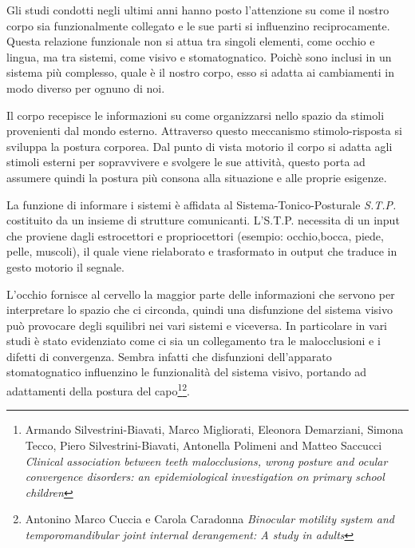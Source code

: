 



Gli studi condotti negli ultimi anni hanno posto l'attenzione su come il nostro corpo sia funzionalmente collegato e le sue parti si influenzino reciprocamente. Questa relazione funzionale non si attua tra singoli elementi, come occhio e lingua, ma tra sistemi, come visivo e stomatognatico. Poichè sono inclusi in un sistema più complesso, quale è il nostro corpo, esso si adatta ai cambiamenti in modo diverso per ognuno di noi.

Il corpo recepisce le informazioni su come organizzarsi nello spazio da stimoli provenienti dal mondo esterno. Attraverso questo meccanismo stimolo-risposta si sviluppa la postura corporea. Dal punto di vista motorio il corpo si adatta agli stimoli esterni per sopravvivere e svolgere le sue attività, questo porta ad assumere quindi la postura più consona alla situazione e alle proprie esigenze. 

La funzione di informare i sistemi è affidata al Sistema-Tonico-Posturale \emph{S.T.P.} costituito da un insieme di strutture comunicanti. L'S.T.P. necessita di un input che proviene dagli estrocettori e propriocettori (esempio: occhio,bocca, piede, pelle, muscoli), il quale viene rielaborato e trasformato in output che traduce in gesto motorio il segnale.

L'occhio fornisce al cervello la maggior parte delle informazioni che servono per interpretare lo spazio che ci circonda, quindi una disfunzione del sistema visivo può provocare degli squilibri nei vari sistemi e viceversa. In particolare in vari studi è stato evidenziato come ci sia un collegamento tra le malocclusioni e i difetti di convergenza. Sembra infatti che disfunzioni dell'apparato stomatognatico influenzino le funzionalità del sistema visivo, portando ad adattamenti della postura del capo\footnote{Armando Silvestrini-Biavati, Marco Migliorati, Eleonora Demarziani, Simona Tecco, Piero Silvestrini-Biavati, Antonella Polimeni and Matteo Saccucci \emph{Clinical association between teeth malocclusions, wrong posture and ocular convergence disorders: an epidemiological investigation on primary school children}}\footnote{Antonino Marco Cuccia e Carola Caradonna \emph{Binocular motility system and temporomandibular joint internal derangement: A study in adults}}. 


